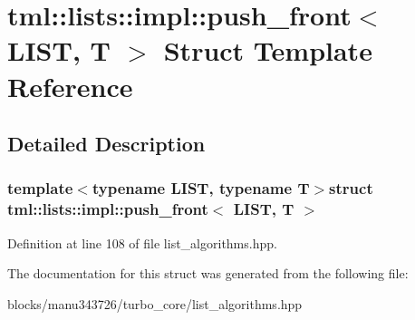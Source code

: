 \hypertarget{structtml_1_1lists_1_1impl_1_1push__front}{\section{tml\+:\+:lists\+:\+:impl\+:\+:push\+\_\+front$<$ L\+I\+S\+T, T $>$ Struct Template Reference}
\label{structtml_1_1lists_1_1impl_1_1push__front}
}


\subsection{Detailed Description}
\subsubsection*{template$<$typename L\+I\+S\+T, typename T$>$struct tml\+::lists\+::impl\+::push\+\_\+front$<$ L\+I\+S\+T, T $>$}



Definition at line 108 of file list\+\_\+algorithms.\+hpp.



The documentation for this struct was generated from the following file\+:\begin{DoxyCompactItemize}
\item 
blocks/manu343726/turbo\+\_\+core/list\+\_\+algorithms.\+hpp\end{DoxyCompactItemize}
